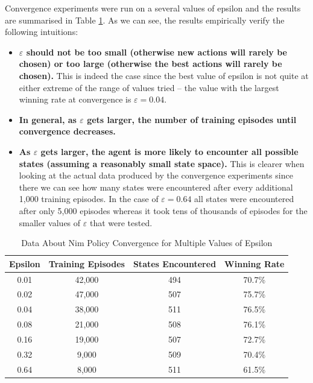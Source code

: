 \documentclass[11pt,a4paper]{report}
\begin{document}
Convergence experiments were run on a several values of epsilon and the results are summarised in Table \ref{table:nim_convergence_table}. As we can see, the results empirically verify the following intuitions:

\begin{itemize}

	\item \textbf{$\varepsilon$ should not be too small (otherwise new actions will rarely be chosen) or too large (otherwise the best actions will rarely be chosen).} This is indeed the case since the best value of epsilon is not quite at either extreme of the range of values tried -- the value with the largest winning rate at convergence is $\varepsilon = 0.04$.

	\item \textbf{In general, as $\varepsilon$ gets larger, the number of training episodes until convergence decreases.}

	\item \textbf{As $\varepsilon$ gets larger, the agent is more likely to encounter all possible states (assuming a reasonably small state space).} This is clearer when looking at the actual data produced by the convergence experiments since there we can see how many states were encountered after every additional 1,000 training episodes. In the case of $\varepsilon = 0.64$ all states were encountered after only 5,000 episodes whereas it took tens of thousands of episodes for the smaller values of $\varepsilon$ that were tested.

\end{itemize}

\begin{table}[ht]
	\centering
	\begin{tabular}{c c c c}
		Epsilon & Training Episodes & States Encountered & Winning Rate \\
		\hline
		0.01 & 42,000 & 494 & 70.7\% \\
		0.02  & 47,000 & 507 & 75.7\% \\
		0.04  & 38,000 & 511 & 76.5\% \\
		0.08  & 21,000 & 508 & 76.1\% \\
		0.16  & 19,000 & 507 & 72.7\% \\
		0.32  & 9,000 & 509 & 70.4\% \\
		0.64 & 8,000 & 511 & 61.5\% \\
	\end{tabular}
	\caption{Data About Nim Policy Convergence for Multiple Values of Epsilon}
	\label{table:nim_convergence_table}
\end{table}
\end{document}
